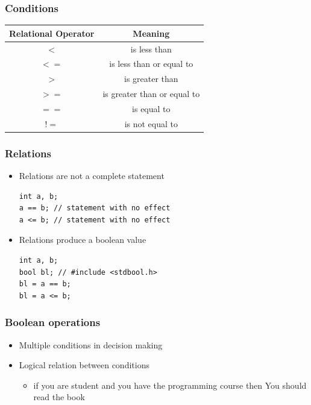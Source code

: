 \documentclass{../c-lecture}
\begin{document}
\begin{frame}
  \frametitle{Conditions}
  \begin{table}
  \begin{tabular}{cc}
    \toprule

    Relational Operator &
    Meaning \\

    \midrule

    $<$ &
    is less than \\

    \midrule

    $<=$ &
    is less than or equal to \\

    \midrule

    $>$ &
    is greater than \\

    \midrule

    $>=$ &
    is greater than or equal to \\

    \midrule

    $==$ &
    is equal to \\

    \midrule

    $!=$ &
    is not equal to \\

    \bottomrule
  \end{tabular}
  \end{table}
\end{frame}

\begin{frame}[fragile]
  \frametitle{Relations}
  \begin{itemize}
    \item Relations are not a complete statement
    \begin{verbatim}
int a, b;
a == b; // statement with no effect
a <= b; // statement with no effect
    \end{verbatim}
    \item Relations produce a boolean value
    \begin{verbatim}
int a, b;
bool bl; // #include <stdbool.h>
bl = a == b;
bl = a <= b;
    \end{verbatim}
  \end{itemize}
\end{frame}

\begin{frame}
  \frametitle{Boolean operations}
  \begin{itemize}
    \item Multiple conditions in decision making
    \item Logical relation between conditions
    \begin{itemize}
      \item
        \textmd{\color{LimeGreen} if} you are student
        \textmd{\color{YellowOrange} and} you have the programming course
        \textmd{\color{Turquoise} then} You should read the book
    \end{itemize}
  \end{itemize}
\end{frame}
\end{document}
